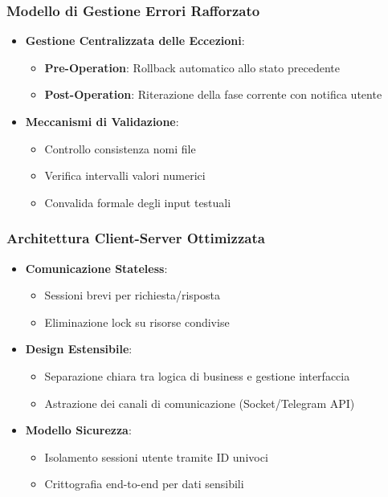 \subsubsection{Modello di Gestione Errori Rafforzato}
\begin{itemize}
    \item \textbf{Gestione Centralizzata delle Eccezioni}:
    \begin{itemize}
        \item \textbf{Pre-Operation}: Rollback automatico allo stato precedente
        \item \textbf{Post-Operation}: Riterazione della fase corrente con notifica utente
    \end{itemize}

    \item \textbf{Meccanismi di Validazione}:
    \begin{itemize}
        \item Controllo consistenza nomi file
        \item Verifica intervalli valori numerici
        \item Convalida formale degli input testuali
    \end{itemize}
\end{itemize}

\subsubsection{Architettura Client-Server Ottimizzata}
\begin{itemize}
    \item \textbf{Comunicazione Stateless}:
    \begin{itemize}
        \item Sessioni brevi per richiesta/risposta
        \item Eliminazione lock su risorse condivise
    \end{itemize}

    \item \textbf{Design Estensibile}:
    \begin{itemize}
        \item Separazione chiara tra logica di business e gestione interfaccia
        \item Astrazione dei canali di comunicazione (Socket/Telegram API)
    \end{itemize}

    \item \textbf{Modello Sicurezza}:
    \begin{itemize}
        \item Isolamento sessioni utente tramite ID univoci
        \item Crittografia end-to-end per dati sensibili
    \end{itemize}
\end{itemize}

